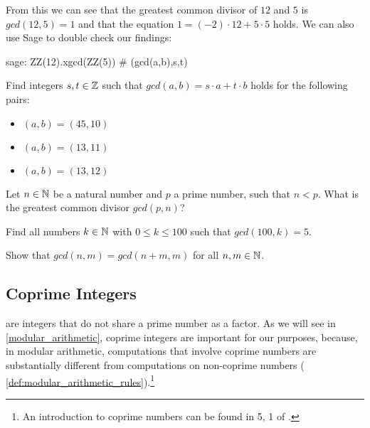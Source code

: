 \begin{example}
\begin{comment}
  
\sme{SB: I'll streamline the outlook of this table once the discrepancy above is resolved.}
\end{comment}

From this we can see that the greatest common divisor of $12$ and $5$ is $ gcd (12, 5) = 1 $ and that the equation $ 1 = (-2) \cdot 12 + 5 \cdot 5 $ holds. We can also use  Sage to double check our findings:
\begin{sagecommandline}
sage: ZZ(12).xgcd(ZZ(5)) # (gcd(a,b),s,t)
\end{sagecommandline}
\end{example}
\begin{exercise}
\label{exercise:extended_Euclidean_division_1}
Find integers $s,t\in\mathbb{Z}$ such that $gcd(a,b)= s\cdot a +t\cdot b$ holds for the following pairs:
\begin{itemize}\compactlist{}
\item $(a,b) = (45,10)$
\item $(a,b)=(13,11)$
\item $(a,b)=(13,12)$
\end{itemize}
\end{exercise}
\begin{exercise}
\label{exercise_towards_counting_numbers}
Let $n\in \mathbb{N}$ be a natural number and $p$ a prime number, such that $n<p$. What is the greatest common divisor $gcd(p,n)$?
\end{exercise}
\begin{exercise}
Find all numbers $k\in\mathbb{N}$ with $0\leq k \leq 100$ such that $gcd(100,k) = 5$.
\end{exercise}
\begin{exercise}
Show that $gcd(n,m) = gcd(n+m,m)$ for all $n,m\in\mathbb{N}$.
\end{exercise}
\subsection{Coprime Integers}
\label{def:coprime_integers}
 are integers that do not share a prime number as a factor. As we will see in \secname{} \ref{modular_arithmetic}, coprime integers are important for our purposes, because, in modular arithmetic, computations that involve coprime numbers are substantially different from computations on non-coprime numbers ( \ref{def:modular_arithmetic_rules}).\footnote{An introduction to coprime numbers can be found in \chaptname{} 5, \secname{} 1 of \cite{hardy-2008}.}

